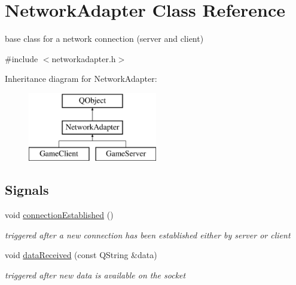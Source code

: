 \hypertarget{class_network_adapter}{\section{Network\-Adapter Class Reference}
\label{class_network_adapter}
}


base class for a network connection (server and client)  




{\ttfamily \#include $<$networkadapter.\-h$>$}

Inheritance diagram for Network\-Adapter\-:\begin{figure}[H]
\begin{center}
\leavevmode
\includegraphics[height=3.000000cm]{class_network_adapter}
\end{center}
\end{figure}
\subsection*{Signals}
\begin{DoxyCompactItemize}
\item 
\hypertarget{class_network_adapter_a2da2230a1cdf125105537d7a5b143bd0}{void \hyperlink{class_network_adapter_a2da2230a1cdf125105537d7a5b143bd0}{connection\-Established} ()}\label{class_network_adapter_a2da2230a1cdf125105537d7a5b143bd0}

\begin{DoxyCompactList}\small\item\em triggered after a new connection has been established either by server or client \end{DoxyCompactList}\item 
\hypertarget{class_network_adapter_ac2e6cce84f774b166dfda66e98ee655e}{void \hyperlink{class_network_adapter_ac2e6cce84f774b166dfda66e98ee655e}{data\-Received} (const Q\-String \&data)}\label{class_network_adapter_ac2e6cce84f774b166dfda66e98ee655e}

\begin{DoxyCompactList}\small\item\em triggered after new data is available on the socket \end{DoxyCompactList}\end{DoxyCompactItemize}
